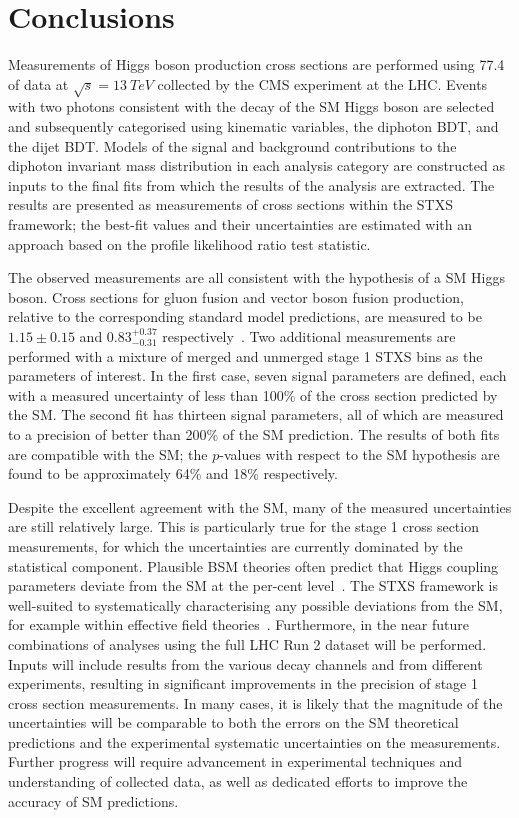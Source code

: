\chapter{Conclusions}
\label{chap:conclusions}

Measurements of Higgs boson production cross sections are performed using \SI{77.4}{\fbinv} of 
data at $\sqrt{s} = \SI{13}{TeV}$ collected by the CMS experiment at the LHC.
Events with two photons consistent with the decay of the SM Higgs boson are selected
and subsequently categorised using kinematic variables, the diphoton BDT, and the dijet BDT.
Models of the signal and background contributions to the diphoton invariant mass distribution 
in each analysis category are constructed as inputs to the final fits 
from which the results of the analysis are extracted.
The results are presented as measurements of cross sections within the STXS framework;
the best-fit values and their uncertainties are estimated with an approach 
based on the profile likelihood ratio test statistic.

The observed measurements are all consistent with the hypothesis of a SM Higgs boson.
Cross sections for gluon fusion and vector boson fusion production, 
relative to the corresponding standard model predictions,
are measured to be $1.15 \pm 0.15$ and $0.83_{-0.31}^{+0.37}$ respectively~\cite{HIG-18-029}.
Two additional measurements are performed with a mixture of merged and unmerged 
stage 1 STXS bins as the parameters of interest.
In the first case, seven signal parameters are defined, 
each with a measured uncertainty of less than 100\% of the cross section predicted by the SM.
The second fit has thirteen signal parameters, all of which are measured to a precision 
of better than 200\% of the SM prediction.
The results of both fits are compatible with the SM; the $p$-values with respect to the SM hypothesis
are found to be approximately 64\% and 18\% respectively.

Despite the excellent agreement with the SM, 
many of the measured uncertainties are still relatively large.
This is particularly true for the stage 1 cross section measurements, 
for which the uncertainties are currently dominated by the statistical component.
Plausible BSM theories often predict that Higgs coupling parameters 
deviate from the SM at the per-cent level~\cite{Snowmass}.
The STXS framework is well-suited to systematically characterising 
any possible deviations from the SM, for example within effective field theories~\cite{STXStoEFT}.
Furthermore, 
in the near future combinations of analyses using the full LHC Run 2 dataset will be performed.
Inputs will include results from the various decay channels and from different experiments, 
resulting in significant improvements in the precision of stage 1 cross section measurements.
In many cases, it is likely that the magnitude of the uncertainties will be comparable to both 
the errors on the SM theoretical predictions 
and the experimental systematic uncertainties on the measurements.
Further progress will require advancement in experimental techniques 
and understanding of collected data, 
as well as dedicated efforts to improve the accuracy of SM predictions.

